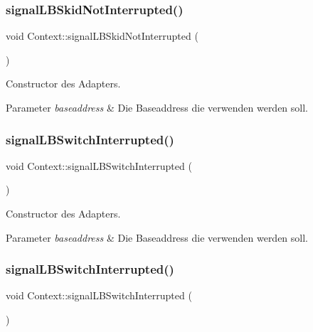 \subsubsection{\texorpdfstring{signal\+L\+B\+Skid\+Not\+Interrupted()}{signalLBSkidNotInterrupted()}\hspace{0.1cm}{\footnotesize\ttfamily [2/2]}}
{\footnotesize\ttfamily void Context\+::signal\+L\+B\+Skid\+Not\+Interrupted (\begin{DoxyParamCaption}{ }\end{DoxyParamCaption})}

Constructor des Adapters.


\begin{DoxyParams}{Parameter}
{\em baseaddress} & Die Baseaddress die verwenden werden soll. \\
\hline
\end{DoxyParams}
\hypertarget{class_context_afdd121a466cf690038ede9b8c2a04160}{}\label{class_context_afdd121a466cf690038ede9b8c2a04160} 
\subsubsection{\texorpdfstring{signal\+L\+B\+Switch\+Interrupted()}{signalLBSwitchInterrupted()}\hspace{0.1cm}{\footnotesize\ttfamily [1/2]}}
{\footnotesize\ttfamily void Context\+::signal\+L\+B\+Switch\+Interrupted (\begin{DoxyParamCaption}{ }\end{DoxyParamCaption})}

Constructor des Adapters.


\begin{DoxyParams}{Parameter}
{\em baseaddress} & Die Baseaddress die verwenden werden soll. \\
\hline
\end{DoxyParams}
\hypertarget{class_context_afdd121a466cf690038ede9b8c2a04160}{}\label{class_context_afdd121a466cf690038ede9b8c2a04160} 
\subsubsection{\texorpdfstring{signal\+L\+B\+Switch\+Interrupted()}{signalLBSwitchInterrupted()}\hspace{0.1cm}{\footnotesize\ttfamily [2/2]}}
{\footnotesize\ttfamily void Context\+::signal\+L\+B\+Switch\+Interrupted (\begin{DoxyParamCaption}{ }\end{DoxyParamCaption})}

